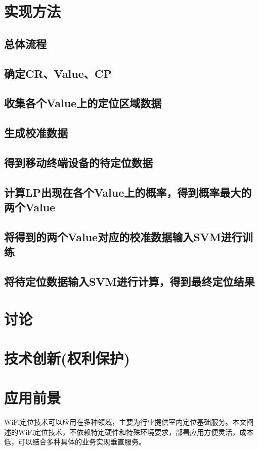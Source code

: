 \documentclass[UTF8, twocolumn ]{ctexart}
\begin{document}

\section{实现方法}
\subsection{总体流程}
\subsection{确定CR、Value、CP}
\subsection{收集各个Value上的定位区域数据}
\subsection{生成校准数据}
\subsection{得到移动终端设备的待定位数据}
\subsection{计算LP出现在各个Value上的概率，得到概率最大的两个Value}
\subsection{将得到的两个Value对应的校准数据输入SVM进行训练}
\subsection{将待定位数据输入SVM进行计算，得到最终定位结果}


\section{讨论}



\section{技术创新(权利保护)}

\section{应用前景}
WiFi定位技术可以应用在多种领域，主要为行业提供室内定位基础服务。本文阐述的WiFi定位技术，不依赖特定硬件和特殊环境要求，部署应用方便灵活，成本低，可以结合多种具体的业务实现垂直服务。
\end{document}
